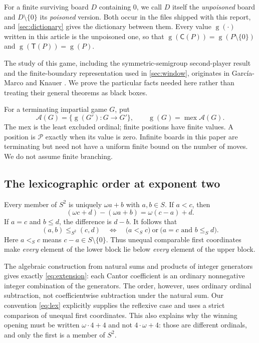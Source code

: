 \documentclass[11pt,letterpaper]{article}
\numberwithin{equation}{section}
\theoremstyle{definition}
\theoremstyle{remark}
\newcommand{\sg}{\operatorname{g}}
\newcommand{\mex}{\operatorname{mex}}
\newcommand{\opt}{\mathcal A}
\newcommand{\Ch}{\mathsf C}
\newcommand{\Norm}{\mathsf T}
\newcommand{\Pout}{\mathcal P}
\begin{document}
For a finite surviving board $D$ containing 0, we call $D$ itself the
\emph{unpoisoned} board and $D\setminus\{0\}$ its \emph{poisoned}
version. Both occur in the files shipped with this report, and
\cref{sec:dictionary} gives the dictionary between them. Every value
$\sg(\cdot)$ written in this article is the unpoisoned one, so that
$\sg(\Ch(P))=\sg(P\setminus\{0\})$ and $\sg(\Norm(P))=\sg(P)$.

The study of this game, including the symmetric-semigroup second-player
result and the finite-boundary representation used in \cref{sec:window},
originates in Garc\'ia-Marco and Knauer \cite{GMK18}. We prove the
particular facts needed here rather than treating their general theorems
as black boxes.

For a terminating impartial game $G$, put
\begin{equation}\label{eq:sg}
 \opt(G)=\{\sg(G'):G\longrightarrow G'\},\qquad
 \sg(G)=\mex\opt(G).
\end{equation}
The mex is the least excluded ordinal; finite positions have finite
values. A position is $\Pout$ exactly when its value is zero. Infinite
boards in this paper are terminating but need not have a uniform finite
bound on the number of moves. We do not assume finite branching.

\subsection{The lexicographic order at exponent two}

Every member of $S^2$ is uniquely $\omega a+b$ with $a,b\in S$.
If $a<c$, then
\[
 (\omega c+d)-(\omega a+b)=\omega(c-a)+d.
\]
If $a=c$ and $b\leq d$, the difference is $d-b$. It follows that
\begin{equation}\label{eq:lex}
 (a,b)\leq_{S^2}(c,d)
 \quad\Longleftrightarrow\quad
 \bigl(a<_S c\bigr)\ \text{or}\
 \bigl(a=c\text{ and }b\leq_S d\bigr).
\end{equation}
Here $a<_S c$ means $c-a\in S\setminus\{0\}$. Thus unequal comparable
first coordinates make \emph{every} element of the lower block lie
below \emph{every} element of the upper block.

The algebraic construction from natural sums and products of integer
generators gives exactly \cref{eq:extension}: each Cantor coefficient
is an ordinary nonnegative integer combination of the generators.
The order, however, uses ordinary ordinal subtraction, not coefficientwise
subtraction under the natural sum. Our convention \cref{eq:lex} explicitly
supplies the reflexive case and uses a strict comparison of unequal first
coordinates. This also explains why the winning opening must be written
$\omega\cdot4+4$ and not $4\cdot\omega+4$: those are different ordinals,
and only the first is a member of $S^2$.
\end{document}
